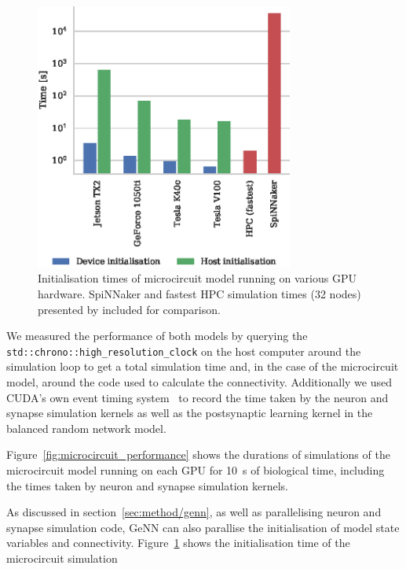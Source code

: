 \documentclass[utf8]{frontiersSCNS} %
\begin{document}
\begin{figure}
    \begin{center}
        \includegraphics[width=85mm]{figures/microcircuit_init_performance}
    \end{center}
    \caption{Initialisation times of microcircuit model running on various GPU hardware.
    SpiNNaker and fastest HPC simulation times (32 nodes) presented by \citet{VanAlbada2018} included for comparison.}
    \label{fig:microcircuit_init_performance}
\end{figure}

We measured the performance of both models by querying the \lstinline{std::chrono::high_resolution_clock} on the host computer around the simulation loop to get a total simulation time and, in the case of the microcircuit model, around the code used to calculate the connectivity.
Additionally we used CUDA's own event timing system~\citep[Section~8.1.2]{NVIDIACorporation2018} to record the time taken by the neuron and synapse simulation kernels as well as the postsynaptic learning kernel in the balanced random network model.

Figure~\ref{fig:microcircuit_performance} shows the durations of simulations of the microcircuit model running on each GPU for \SI{10}{\second} of biological time, including the times taken by neuron and synapse simulation kernels.


As discussed in section~\ref{sec:method/genn}, as well as parallelising neuron and synapse simulation code, GeNN can also parallise the initialisation of model state variables and connectivity.
Figure~\ref{fig:microcircuit_init_performance} shows the initialisation time of the microcircuit simulation 
\end{document}
